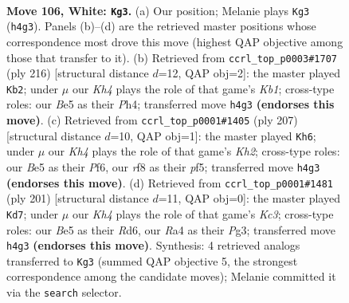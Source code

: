 \documentclass[11pt]{article}
\begin{document}
\clearpage

\begin{figure}[p]\centering
\begin{subfigure}{0.46\textwidth}\centering
\resizebox{\linewidth}{!}{%
\newchessgame
\chessboard[
  setfen={5r2/8/7k/4B3/R6K/P7/8/8 w - - 4 106},
  showmover=false,
  pgfstyle=straightmove, color=movearrow, markmove={h4-g3}
]}
\caption{}
\end{subfigure}\hfill
\begin{subfigure}{0.46\textwidth}\centering
\resizebox{\linewidth}{!}{%
\newchessgame
\chessboard[
  setfen={1R6/8/k7/8/7P/P1r5/8/1K6 w - - 1 109},
  showmover=false,
  pgfstyle=straightmove, color=movearrow, markmove={b1-b2}
]}
\caption{}
\end{subfigure}
\\[4pt]
\begin{subfigure}{0.46\textwidth}\centering
\resizebox{\linewidth}{!}{%
\newchessgame
\chessboard[
  setfen={8/7k/5p2/5P2/7r/5K2/8/6R1 b - - 21 104},
  showmover=false,
  pgfstyle=straightmove, color=movearrow, markmove={h7-h6}
]}
\caption{}
\end{subfigure}\hfill
\begin{subfigure}{0.46\textwidth}\centering
\resizebox{\linewidth}{!}{%
\newchessgame
\chessboard[
  setfen={8/6K1/2kr4/8/7P/6p1/8/4R3 b - - 9 101},
  showmover=false,
  pgfstyle=straightmove, color=movearrow, markmove={c6-d7}
]}
\caption{}
\end{subfigure}
\caption{\textbf{Move 106, White: \texttt{Kg3}.} (a) Our position; Melanie plays \texttt{Kg3} (\texttt{h4g3}). Panels (b)--(d) are the retrieved master positions whose correspondence most drove this move (highest QAP objective among those that transfer to it). (b) Retrieved from \texttt{ccrl\_top\_p0003\#1707} (ply 216) [structural distance $d$=12, QAP obj=2]: the master played \texttt{Kb2}; under $\mu$ our \emph{Kh4} plays the role of that game's \emph{Kb1}; cross-type roles: our \emph{B}e5 as their \emph{P}h4; transferred move \texttt{h4g3} \textbf{(endorses this move)}. (c) Retrieved from \texttt{ccrl\_top\_p0001\#1405} (ply 207) [structural distance $d$=10, QAP obj=1]: the master played \texttt{Kh6}; under $\mu$ our \emph{Kh4} plays the role of that game's \emph{Kh2}; cross-type roles: our \emph{B}e5 as their \emph{P}f6, our \emph{r}f8 as their \emph{p}f5; transferred move \texttt{h4g3} \textbf{(endorses this move)}. (d) Retrieved from \texttt{ccrl\_top\_p0001\#1481} (ply 201) [structural distance $d$=11, QAP obj=0]: the master played \texttt{Kd7}; under $\mu$ our \emph{Kh4} plays the role of that game's \emph{Kc3}; cross-type roles: our \emph{B}e5 as their \emph{R}d6, our \emph{R}a4 as their \emph{P}g3; transferred move \texttt{h4g3} \textbf{(endorses this move)}. Synthesis: 4 retrieved analogs transferred to \texttt{Kg3} (summed QAP objective 5, the strongest correspondence among the candidate moves); Melanie committed it via the \texttt{search} selector.}
\label{fig:thought-m210}
\end{figure}
\end{document}

